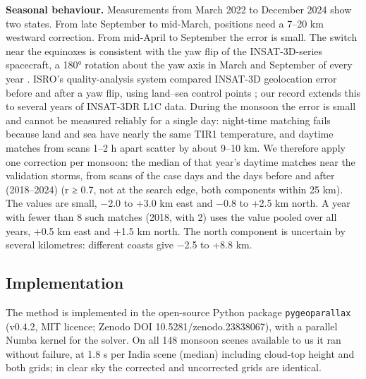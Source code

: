 \textbf{Seasonal behaviour.} Measurements from March 2022 to December 2024 show two states. From late September to mid-March, positions need a 7--20 km westward correction. From mid-April to September the error is small. The switch near the equinoxes is consistent with the yaw flip of the INSAT-3D-series spacecraft, a 180° rotation about the yaw axis in March and September of every year \citep{prakash2014}. ISRO's quality-analysis system compared INSAT-3D geolocation error before and after a yaw flip, using land--sea control points \citep{jindal2014}; our record extends this to several years of INSAT-3DR L1C data. During the monsoon the error is small and cannot be measured reliably for a single day: night-time matching fails because land and sea have nearly the same TIR1 temperature, and daytime matches from scans 1--2 h apart scatter by about 9--10 km. We therefore apply one correction per monsoon: the median of that year's daytime matches near the validation storms, from scans of the case days and the days before and after (2018--2024) (r ≥ 0.7, not at the search edge, both components within 25 km). The values are small, −2.0 to +3.0 km east and −0.8 to +2.5 km north. A year with fewer than 8 such matches (2018, with 2) uses the value pooled over all years, +0.5 km east and +1.5 km north. The north component is uncertain by several kilometres: different coasts give −2.5 to +8.8 km.

\subsection{Implementation}\label{sec:3.7}

The method is implemented in the open-source Python package \texttt{pygeoparallax} (v0.4.2, MIT licence; Zenodo DOI 10.5281/zenodo.23838067), with a parallel Numba kernel \citep{lam2015} for the solver. On all 148 monsoon scenes available to us it ran without failure, at 1.8 s per India scene (median) including cloud-top height and both grids; in clear sky the corrected and uncorrected grids are identical.

